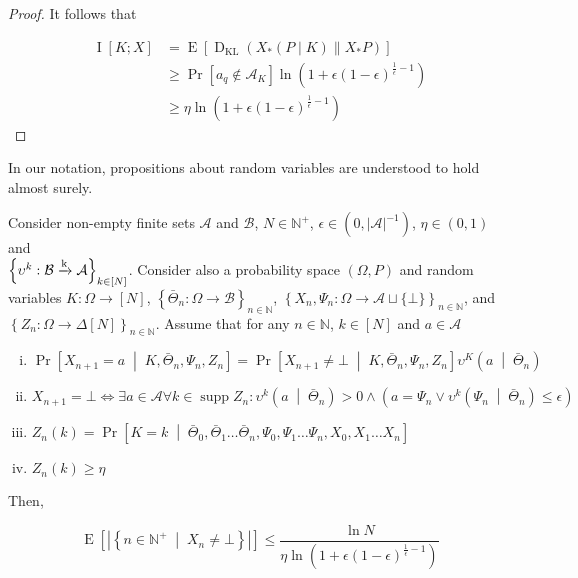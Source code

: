 \documentclass[anon,12pt]{colt2018} %
\DeclareMathOperator{\Supp}{supp}
\newcommand{\AP}[1]{\left(#1\right)}
\newcommand{\AB}[1]{\left[#1\right]}
\newcommand{\AC}[1]{\left\{#1\right\}}
\newcommand{\APM}[2]{\left(#1\;\middle\vert\;#2\right)}
\newcommand{\ABM}[2]{\left[#1\;\middle\vert\;#2\right]}
\newcommand{\ACM}[2]{\left\{#1\;\middle\vert\;#2\right\}}
\newcommand{\Pa}[2]{\underset{#1}{\operatorname{Pr}}\AB{#2}}
\newcommand{\CP}[3]{\underset{#1}{\operatorname{Pr}}\ABM{#2}{#3}}
\newcommand{\Ea}[2]{\underset{#1}{\operatorname{E}}\AB{#2}}
\newcommand{\Ia}[2]{\underset{#1}{\operatorname{I}}\AB{#2}}
\newcommand{\KL}[2]{\operatorname{D}_{\mathrm{KL}}(#1 \| #2)}
\newcommand{\Nats}{\mathbb{N}}
\newcommand{\Abs}[1]{\left\vert #1 \right\vert}
\newcommand{\K}{\xrightarrow{\textnormal{k}}}
\newcommand{\A}{\mathcal{A}}
\newcommand{\Ad}{\upsilon}
\newcommand{\B}{\mathcal{B}}
\begin{document}
\begin{proof}
It follows that

\begin{align*}
\Ia{}{K;X} &= \Ea{}{\KL{X_*(P \mid K)}{X_*P}} \\ 
&\geq \Pa{}{a_q \not \in \A_K} \ln{\AP{1+\epsilon(1-\epsilon)^{\frac{1}{\epsilon}-1}}} \\
&\geq \eta \ln{\AP{1+\epsilon(1-\epsilon)^{\frac{1}{\epsilon}-1}}}
\end{align*}
\end{proof}

In our notation, propositions about random variables are understood to hold almost surely.

\begin{samepage}
\begin{proposition}
\label{prp:delegation}

Consider non-empty finite sets $\A$ and $\B$, $N \in \Nats^+$, $\epsilon\in\AP{0,\Abs{\A}^{-1}}$, $\eta\in(0,1)$ and\\ $\AC{\Ad^k: \B \K \A}_{k\in[N]}$. Consider also  a probability space $(\Omega,P)$ and random variables $K: \Omega \rightarrow [N]$, $\AC{\bar{\Theta}_n: \Omega \rightarrow \B}_{n\in\Nats}$, $\AC{X_n,\Psi_n: \Omega \rightarrow \A \sqcup \{\bot\}}_{n \in \Nats}$, and $\AC{Z_n: \Omega \rightarrow \Delta[N]}_{n \in \Nats}$. Assume that for any $n\in\Nats$, $k\in[N]$ and $a\in\A$

\begin{enumerate}[i.]

\item\label{con:prp__delegation__xa} $\CP{}{X_{n+1} = a}{K,\bar{\Theta}_n,\Psi_n,Z_n}=\CP{}{X_{n+1}\ne\bot}{K,\bar{\Theta}_n,\Psi_n,Z_n} \Ad^K\APM{a}{\bar{\Theta}_n}$
\item\label{con:prp__delegation__xbot} $X_{n+1} = \bot \iff \exists a \in \A \forall k \in \Supp{Z_n}: \Ad^k\APM{a}{\bar{\Theta}_n} > 0 \land \AP{a=\Psi_n \lor \Ad^k\APM{\Psi_n}{\bar{\Theta}_n} \leq \epsilon}$
\item\label{con:prp__delegation__z} $Z_n(k)=\CP{}{K = k}{\bar{\Theta}_0,\bar{\Theta}_1\dots\bar{\Theta}_{n},\Psi_0,\Psi_1\dots\Psi_n,X_0,X_1 \dots X_{n}}$
\item\label{con:prp__delegation__eta} $Z_n(k) \geq \eta$

\end{enumerate}

Then,

\begin{equation}
\Ea{}{\Abs{\ACM{n\in\Nats^+}{X_n\ne\bot}}} \leq \frac{\ln{N}}{\eta\ln{\AP{1+\epsilon(1-\epsilon)^{\frac{1}{\epsilon}-1}}}}
\end{equation}

\end{proposition}
\end{samepage}
\end{document}

